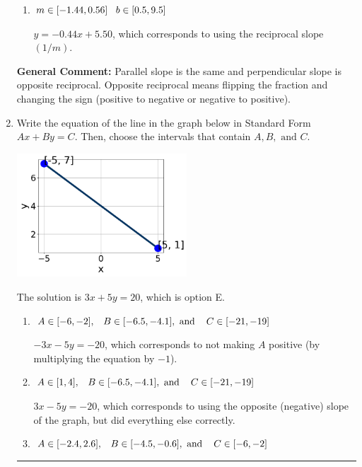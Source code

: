 \documentclass{extbook}[14pt]
\newcommand{\litem}[1]{\item #1

\rule{\textwidth}{0.4pt}}
\begin{document}
\begin{enumerate}
{\begin{enumerate}[label=\Alph*.]
 $y = -2.25x - 14.00$, which corresponds to correct slope and mis-distributing while simplifying to slope-intercept form.
\item \( m \in [-1.44, 0.56] \hspace*{3mm} b \in [0.5, 9.5] \)

 $y = -0.44x + 5.50$, which corresponds to using the reciprocal slope $(1/m)$.
\end{enumerate}

\textbf{General Comment:} Parallel slope is the same and perpendicular slope is opposite reciprocal. Opposite reciprocal means flipping the fraction and changing the sign (positive to negative or negative to positive).
}
\litem{
Write the equation of the line in the graph below in Standard Form $Ax+By=C$. Then, choose the intervals that contain $A, B, \text{ and } C$.

\begin{center}
    \includegraphics[width=0.5\textwidth]{../Figures/linearGraphToStandardA.png}
\end{center}


The solution is \( 3x + 5y = 20 \), which is option E.\begin{enumerate}[label=\Alph*.]
\item \( A \in [-6, -2], \hspace{3mm} B \in [-6.5, -4.1], \text{ and } \hspace{3mm} C \in [-21, -19] \)

 $-3x - 5y = -20$, which corresponds to not making $A$ positive (by multiplying the equation by $-1$).
\item \( A \in [1, 4], \hspace{3mm} B \in [-6.5, -4.1], \text{ and } \hspace{3mm} C \in [-21, -19] \)

 $3x - 5y = -20$, which corresponds to using the opposite (negative) slope of the graph, but did everything else correctly.
\item \( A \in [-2.4, 2.6], \hspace{3mm} B \in [-4.5, -0.6], \text{ and } \hspace{3mm} C \in [-6, -2] \)


\end{enumerate}}
\end{enumerate}
\end{document}
